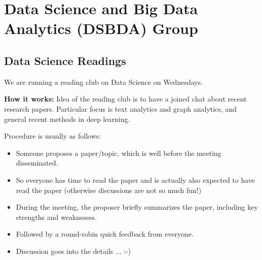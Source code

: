 \documentclass[manuscript, nonacm]{acmart}
\begin{document}



\maketitle

\tableofcontents


\section{Data Science and Big Data Analytics (DSBDA) Group}


\subsection{Data Science Readings}

We are running a reading club on Data Science on Wednesdays. 

\textbf{How it works:}
Idea of the reading club is to have a joined chat about recent research papers. Particular focus is text analytics and graph analytics, and general recent methods in deep learning. 

Procedure is usually as follows:
\begin{itemize}
\item Someone proposes a paper/topic, which is well before the meeting disseminated.
\item So everyone has time to read the paper and is actually also expected to have read the paper (otherwise discussions are not so much fun!)
\item During the meeting, the proposer briefly summarizes the paper, including key strengths and weaknesses.
\item Followed by a round-robin quick feedback from everyone.
\item Discussion goes into the details ... :-)
\end{itemize}
\end{document}
